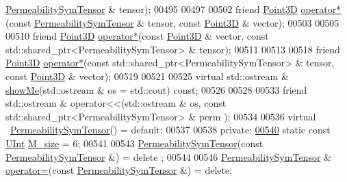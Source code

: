\begin{DoxyCode}
      \hyperlink{classFVCode3D_1_1PermeabilitySymTensor}{PermeabilitySymTensor} & tensor);
00495 
00497 
00502     \textcolor{keyword}{friend} \hyperlink{classFVCode3D_1_1Point3D}{Point3D} \hyperlink{classFVCode3D_1_1PermeabilityBase_a04284b595d50559389f6098e76611b76}{operator*}(\textcolor{keyword}{const} \hyperlink{classFVCode3D_1_1PermeabilitySymTensor}{PermeabilitySymTensor} & tensor, \textcolor{keyword}{
      const} \hyperlink{classFVCode3D_1_1Point3D}{Point3D} & vector);
00503 
00505 
00510     \textcolor{keyword}{friend} \hyperlink{classFVCode3D_1_1Point3D}{Point3D} \hyperlink{classFVCode3D_1_1PermeabilityBase_a04284b595d50559389f6098e76611b76}{operator*}(\textcolor{keyword}{const} \hyperlink{classFVCode3D_1_1Point3D}{Point3D} & vector, \textcolor{keyword}{const} 
      std::shared\_ptr<PermeabilitySymTensor> & tensor);
00511 
00513 
00518     \textcolor{keyword}{friend} \hyperlink{classFVCode3D_1_1Point3D}{Point3D} \hyperlink{classFVCode3D_1_1PermeabilityBase_a04284b595d50559389f6098e76611b76}{operator*}(\textcolor{keyword}{const} std::shared\_ptr<PermeabilitySymTensor> & tensor, \textcolor{keyword}{const} 
      \hyperlink{classFVCode3D_1_1Point3D}{Point3D} & vector);
00519 
00521 
00525     \textcolor{keyword}{virtual} std::ostream & \hyperlink{classFVCode3D_1_1PermeabilityBase_a4f06952af19c0100b6b6043fa1f8f97a}{showMe}(std::ostream & os = std::cout) \textcolor{keyword}{const};
00526 
00528 
00533     \textcolor{keyword}{friend} std::ostream & operator<<(std::ostream & os, const std::shared\_ptr<PermeabilitySymTensor> & perm
      );
00534 
00536     \textcolor{keyword}{virtual} ~\hyperlink{classFVCode3D_1_1PermeabilitySymTensor}{PermeabilitySymTensor}() = \textcolor{keywordflow}{default};
00537 
00538 \textcolor{keyword}{private}:
\hypertarget{Permeability_8hpp_source.tex_l00540}{}\hyperlink{classFVCode3D_1_1PermeabilitySymTensor_a611205289ba216ec4505dd76a284dd9b}{00540}     \textcolor{keyword}{static} \textcolor{keyword}{const} \hyperlink{namespaceFVCode3D_a4bf7e328c75d0fd504050d040ebe9eda}{UInt} \hyperlink{classFVCode3D_1_1PermeabilityBase_a5914ac070cdad89b5b6f0133a0ee3ba5}{M\_size} = 6;
00541 
00543     \hyperlink{classFVCode3D_1_1PermeabilitySymTensor}{PermeabilitySymTensor}(\textcolor{keyword}{const} \hyperlink{classFVCode3D_1_1PermeabilitySymTensor}{PermeabilitySymTensor} &) = \textcolor{keyword}{delete}
      ;
00544 
00546     \hyperlink{classFVCode3D_1_1PermeabilitySymTensor}{PermeabilitySymTensor} & \hyperlink{classFVCode3D_1_1PermeabilityBase_abc8abcfca62e9520d74dd09dd324bd9c}{operator=}(\textcolor{keyword}{const} 
      \hyperlink{classFVCode3D_1_1PermeabilitySymTensor}{PermeabilitySymTensor} &) = \textcolor{keyword}{delete};

\end{DoxyCode}
